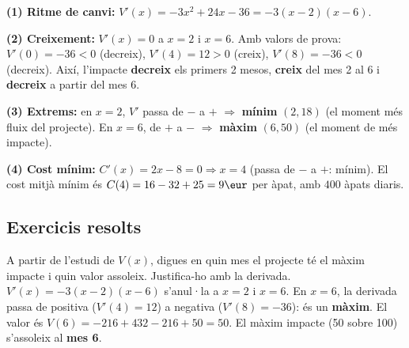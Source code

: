 \begin{exemple}
\begin{center}

\end{center}
\end{exemple}

\begin{exemple}
\textbf{(1) Ritme de canvi:} $V'(x)=-3x^2+24x-36=-3(x-2)(x-6)$.

\noindent\textbf{(2) Creixement:} $V'(x)=0$ a $x=2$ i $x=6$. Amb valors de prova:
$V'(0)=-36<0$ (decreix), $V'(4)=12>0$ (creix), $V'(8)=-36<0$ (decreix). Així, l'impacte
\textbf{decreix} els primers 2 mesos, \textbf{creix} del mes 2 al 6 i \textbf{decreix}
a partir del mes 6.

\noindent\textbf{(3) Extrems:} en $x=2$, $V'$ passa de $-$ a $+$ $\Rightarrow$
\textbf{mínim} $(2,18)$ (el moment més fluix del projecte). En $x=6$, de $+$ a $-$
$\Rightarrow$ \textbf{màxim} $(6,50)$ (el moment de més impacte).

\noindent\textbf{(4) Cost mínim:} $C'(x)=2x-8=0\Rightarrow x=4$ (passa de $-$ a $+$:
mínim). El cost mitjà mínim és $C(4)=16-32+25=9\eur$ per àpat, amb $400$ àpats diaris.
\end{exemple}

\subsection{Exercicis resolts}

\begin{exresolt}
A partir de l'estudi de $V(x)$, digues en quin mes el projecte té el màxim impacte i
quin valor assoleix. Justifica-ho amb la derivada.
\solucio
$V'(x)=-3(x-2)(x-6)$ s'anul·la a $x=2$ i $x=6$. En $x=6$, la derivada passa de positiva
($V'(4)=12$) a negativa ($V'(8)=-36$): és un \textbf{màxim}. El valor és
$V(6)=-216+432-216+50=50$. El màxim impacte (50 sobre 100) s'assoleix al \textbf{mes 6}.
\end{exresolt}

